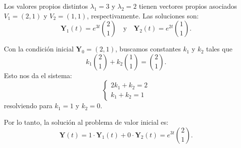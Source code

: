 \documentclass{report}
\begin{document}
    Los valores propios distintos \(\lambda_1 = 3\) y \(\lambda_2 = 2\) tienen vectores propios asociados \(V_1 = (2, 1)\) y \(V_2 = (1, 1)\), respectivamente. Las soluciones son:
    \[
    \mathbf{Y}_1(t) = e^{3t} \binom{2}{1} \quad \text{y} \quad \mathbf{Y}_2(t) = e^{2t} \binom{1}{1}.
    \]

    Con la condición inicial \(\mathbf{Y}_0 = (2, 1)\), buscamos constantes \(k_1\) y \(k_2\) tales que
    \[
    k_1 \binom{2}{1} + k_2 \binom{1}{1} = \binom{2}{1}.
    \]
    Esto nos da el sistema:
    \[
    \begin{cases}
    2k_1 + k_2 = 2 \\
    k_1 + k_2 = 1
    \end{cases}
    \]
    resolviendo para \(k_1 = 1\) y \(k_2 = 0\).

    Por lo tanto, la solución al problema de valor inicial es:
    \[
    \mathbf{Y}(t) = 1 \cdot \mathbf{Y}_1(t) + 0 \cdot \mathbf{Y}_2(t) = e^{3t} \binom{2}{1}.
    \]
\end{document}
